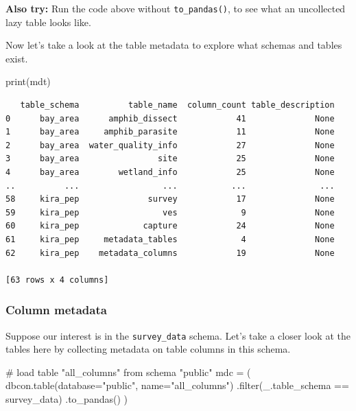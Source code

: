 \documentclass[
  letterpaper,
  DIV=11,
  numbers=noendperiod]{scrartcl}
\newenvironment{Shaded}{\begin{snugshade}}{\end{snugshade}}
\newcommand{\BuiltInTok}[1]{\textcolor[rgb]{0.00,0.23,0.31}{#1}}
\newcommand{\CommentTok}[1]{\textcolor[rgb]{0.37,0.37,0.37}{#1}}
\newcommand{\NormalTok}[1]{\textcolor[rgb]{0.00,0.23,0.31}{#1}}
\newcommand{\OperatorTok}[1]{\textcolor[rgb]{0.37,0.37,0.37}{#1}}
\newcommand{\StringTok}[1]{\textcolor[rgb]{0.13,0.47,0.30}{#1}}
\begin{document}
\textbf{Also try:} Run the code above without \texttt{to\_pandas()}, to
see what an uncollected lazy table looks like.

Now let's take a look at the table metadata to explore what schemas and
tables exist.

\begin{Shaded}
\begin{Highlighting}[]
\BuiltInTok{print}\NormalTok{(mdt)}
\end{Highlighting}
\end{Shaded}

\begin{verbatim}
   table_schema          table_name  column_count table_description
0      bay_area      amphib_dissect            41              None
1      bay_area     amphib_parasite            11              None
2      bay_area  water_quality_info            27              None
3      bay_area                site            25              None
4      bay_area        wetland_info            25              None
..          ...                 ...           ...               ...
58     kira_pep              survey            17              None
59     kira_pep                 ves             9              None
60     kira_pep             capture            24              None
61     kira_pep     metadata_tables             4              None
62     kira_pep    metadata_columns            19              None

[63 rows x 4 columns]
\end{verbatim}

\subsubsection{Column metadata}\label{column-metadata-1}

Suppose our interest is in the \texttt{survey\_data} schema. Let's take
a closer look at the tables here by collecting metadata on table columns
in this schema.

\begin{Shaded}
\begin{Highlighting}[]
\CommentTok{\# load table "all\_columns" from schema "public"}
\NormalTok{mdc }\OperatorTok{=}\NormalTok{ (}
\NormalTok{  dbcon.table(database}\OperatorTok{=}\StringTok{"public"}\NormalTok{, name}\OperatorTok{=}\StringTok{"all\_columns"}\NormalTok{)}
\NormalTok{  .}\BuiltInTok{filter}\NormalTok{(\_.table\_schema }\OperatorTok{==} \StringTok{\textquotesingle{}survey\_data\textquotesingle{}}\NormalTok{)}
\NormalTok{  .to\_pandas()}
\NormalTok{)}
\end{Highlighting}
\end{Shaded}
\end{document}
